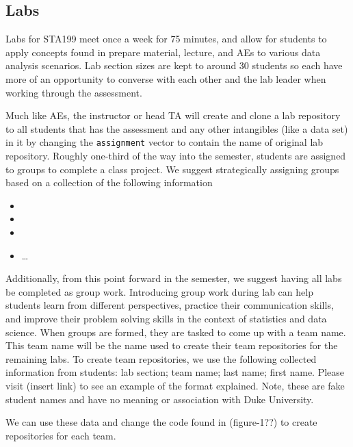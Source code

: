 \documentclass[
  12pt]{article}
\providecommand{\tightlist}{%
  \setlength{\itemsep}{0pt}\setlength{\parskip}{0pt}}\usepackage{longtable,booktabs,array}
\begin{document}
\hypertarget{labs}{%
\subsection{Labs}\label{labs}}

Labs for STA199 meet once a week for 75 minutes, and allow for students
to apply concepts found in prepare material, lecture, and AEs to various
data analysis scenarios. Lab section sizes are kept to around 30
students so each have more of an opportunity to converse with each other
and the lab leader when working through the assessment.

Much like AEs, the instructor or head TA will create and clone a lab
repository to all students that has the assessment and any other
intangibles (like a data set) in it by changing the \texttt{assignment}
vector to contain the name of original lab repository. Roughly one-third
of the way into the semester, students are assigned to groups to
complete a class project. We suggest strategically assigning groups
based on a collection of the following information

\begin{itemize}
\tightlist
\item
\item
\item
\item
  \ldots{}
\end{itemize}

Additionally, from this point forward in the semester, we suggest having
all labs be completed as group work. Introducing group work during lab
can help students learn from different perspectives, practice their
communication skills, and improve their problem solving skills in the
context of statistics and data science. When groups are formed, they are
tasked to come up with a team name. This team name will be the name used
to create their team repositories for the remaining labs. To create team
repositories, we use the following collected information from students:
lab section; team name; last name; first name. Please visit (insert
link) to see an example of the format explained. Note, these are fake
student names and have no meaning or association with Duke University.

We can use these data and change the code found in (figure-1??) to
create repositories for each team.
\end{document}
